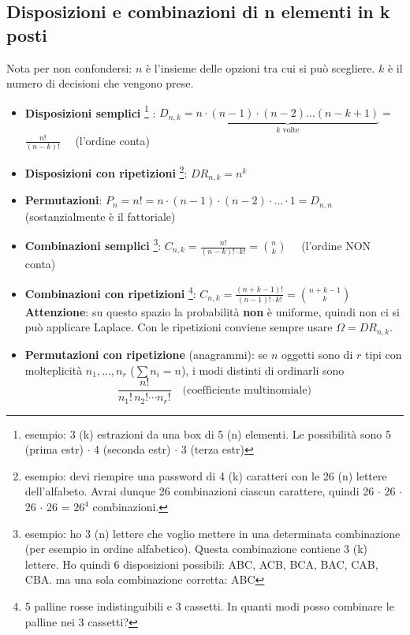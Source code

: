 \documentclass[12pt]{extarticle} %
\begin{document}
\subsection{Disposizioni e combinazioni  {\footnotesize di n elementi in k posti}}
Nota per non confondersi: $n$ è l'insieme delle opzioni tra cui si può scegliere. $k$ è il numero di decisioni che vengono prese.
\begin{itemize}
    \item \textbf{Disposizioni semplici} \footnote{esempio: 3 (k) estrazioni da una box di 5 (n) elementi. Le possibilità sono 5 (prima estr) $\cdot$ 4 (seconda estr) $\cdot$ 3 (terza estr)} :  $D_{n,k} = \underbrace{n \cdot (n-1) \cdot (n-2) \dots (n-k+1)}_{k \text{ volte}} =$ {\large $\frac{n!}{(n-k)!} \quad$} {\footnotesize (l'ordine conta)}

    \item \textbf{Disposizioni con ripetizioni} \footnote{esempio: devi riempire una password di 4 (k) caratteri con le 26 (n) lettere dell'alfabeto. Avrai dunque 26 combinazioni ciascun carattere, quindi 26 $\cdot$ 26 $\cdot$ 26 $\cdot$ 26 = $26^4$ combinazioni.}: $DR_{n,k} = n^{k}$ 

    \item \textbf{Permutazioni}: $P_n = n! = n \cdot (n-1) \cdot (n-2) \cdot \dots \cdot 1 = D_{n,n} \quad$ {\footnotesize (sostanzialmente è il fattoriale)}

    \item \textbf{Combinazioni semplici} \footnote{esempio: ho 3 (n) lettere che voglio mettere in una determinata combinazione (per esempio in ordine alfabetico). Questa combinazione contiene 3 (k) lettere. Ho quindi 6 disposizioni possibili: ABC, ACB, BCA, BAC, CAB, CBA. ma una sola combinazione corretta: ABC}: {\large $C_{n,k} =  \frac{n!}{(n-k)! \cdot k!} = \binom{n}{k} \quad$ } {\footnotesize (l'ordine NON conta)}

    \item \textbf{Combinazioni con ripetizioni} \footnote{ 5 palline rosse indistinguibili e 3 cassetti. In quanti modi posso combinare le palline nei 3 cassetti?}: {\large $C_{n,k} =  \frac{(n+k-1)!}{(n-1)! \cdot k!} = \binom{n+k-1}{k}$ } \\ {\footnotesize \textbf{Attenzione}: su questo spazio la probabilità \textbf{non} è uniforme, quindi non ci si può applicare Laplace. Con le ripetizioni conviene sempre usare $\Omega = DR_{n,k}$.}

    \item \textbf{Permutazioni con ripetizione} (anagrammi): se $n$ oggetti sono di $r$ tipi con molteplicità $n_1,\dots,n_r$ ($\sum n_i = n$), i modi distinti di ordinarli sono
    $$ \frac{n!}{n_1! \, n_2! \cdots n_r!} \quad \text{(coefficiente multinomiale)} $$
\end{itemize}
\end{document}
